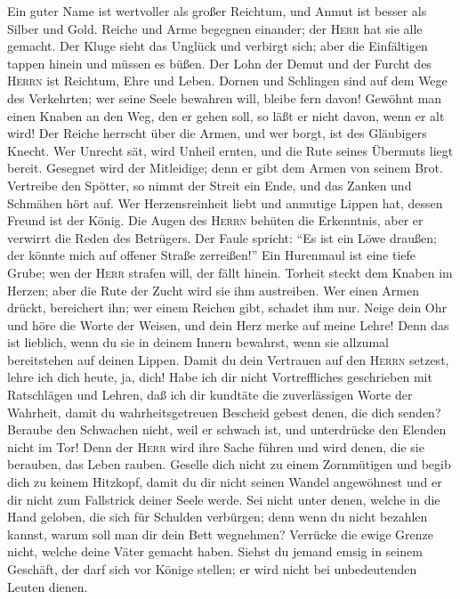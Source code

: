  Ein guter Name ist wertvoller als großer Reichtum, und
Anmut ist besser als Silber und Gold.  Reiche und Arme
begegnen einander; der \textsc{Herr} hat sie alle gemacht.
 Der Kluge sieht das Unglück und verbirgt sich; aber die
Einfältigen tappen hinein und müssen es büßen.  Der Lohn
der Demut und der Furcht des \textsc{Herrn} ist Reichtum, Ehre und
Leben.  Dornen und Schlingen sind auf dem Wege des
Verkehrten; wer seine Seele bewahren will, bleibe fern davon!
 Gewöhnt man einen Knaben an den Weg, den er gehen soll,
so läßt er nicht davon, wenn er alt wird!  Der Reiche
herrscht über die Armen, und wer borgt, ist des Gläubigers Knecht.
 Wer Unrecht sät, wird Unheil ernten, und die Rute seines
Übermuts liegt bereit.  Gesegnet wird der Mitleidige; denn
er gibt dem Armen von seinem Brot.  Vertreibe den
Spötter, so nimmt der Streit ein Ende, und das Zanken und Schmähen hört
auf.  Wer Herzensreinheit liebt und anmutige Lippen hat,
dessen Freund ist der König.  Die Augen des
\textsc{Herrn} behüten die Erkenntnis, aber er verwirrt die Reden des
Betrügers.  Der Faule spricht: ``Es ist ein Löwe draußen;
der könnte mich auf offener Straße zerreißen!''  Ein
Hurenmaul ist eine tiefe Grube; wen der \textsc{Herr} strafen will, der
fällt hinein.  Torheit steckt dem Knaben im Herzen; aber
die Rute der Zucht wird sie ihm austreiben.  Wer einen
Armen drückt, bereichert ihn; wer einem Reichen gibt, schadet ihm nur.
 Neige dein Ohr und höre die Worte der Weisen, und dein
Herz merke auf meine Lehre!  Denn das ist lieblich, wenn
du sie in deinem Innern bewahrst, wenn sie allzumal bereitstehen auf
deinen Lippen.  Damit du dein Vertrauen auf den
\textsc{Herrn} setzest, lehre ich dich heute, ja, dich! 
Habe ich dir nicht Vortreffliches geschrieben mit Ratschlägen und
Lehren,  daß ich dir kundtäte die zuverlässigen Worte der
Wahrheit, damit du wahrheitsgetreuen Bescheid gebest denen, die dich
senden?  Beraube den Schwachen nicht, weil er schwach
ist, und unterdrücke den Elenden nicht im Tor!  Denn der
\textsc{Herr} wird ihre Sache führen und wird denen, die sie berauben,
das Leben rauben.  Geselle dich nicht zu einem
Zornmütigen und begib dich zu keinem Hitzkopf,  damit du
dir nicht seinen Wandel angewöhnest und er dir nicht zum Fallstrick
deiner Seele werde.  Sei nicht unter denen, welche in die
Hand geloben, die sich für Schulden verbürgen;  denn wenn
du nicht bezahlen kannst, warum soll man dir dein Bett wegnehmen?
 Verrücke die ewige Grenze nicht, welche deine Väter
gemacht haben.  Siehst du jemand emsig in seinem
Geschäft, der darf sich vor Könige stellen; er wird nicht bei
unbedeutenden Leuten dienen.

